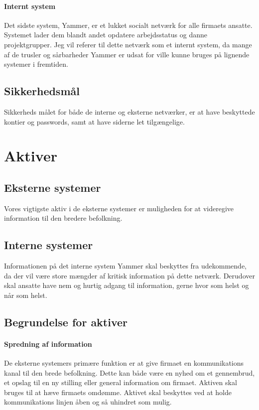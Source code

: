 \documentclass{article}
\begin{document}
\paragraph{Internt system}
Det sidste system, Yammer, er et lukket socialt netværk for alle firmaets ansatte. Systemet lader dem blandt andet opdatere arbejdsstatus og danne projektgrupper. Jeg vil referer til dette netværk som et internt system, da mange af de trusler og sårbarheder Yammer er udsat for ville kunne bruges på lignende systemer i fremtiden.

\subsection{Sikkerhedsmål}

Sikkerheds målet for både de interne og eksterne netværker, er at have beskyttede kontier og passwords,
samt at have siderne let tilgængelige. 

\section{Aktiver}
\subsection{Eksterne systemer}
Vores vigtigste aktiv i de eksterne systemer er muligheden for at videregive information til den bredere befolkning. 

\subsection{Interne systemer}
Informationen på det interne system Yammer skal beskyttes fra udekommende, da der vil være store mængder af kritisk information på dette netværk. Derudover skal ansatte have nem og hurtig adgang til information, gerne hvor som helst og når som helst.

\subsection{Begrundelse for aktiver}

\paragraph{Spredning af information}
De eksterne systemers primære funktion er at give firmaet en kommunikations kanal til den brede befolkning. Dette kan både være en nyhed om et gennembrud, et opslag til en ny stilling eller general information om firmaet. Aktiven skal bruges til at hæve firmaets omdømme. Aktivet skal beskyttes ved at holde kommunikations linjen åben og så uhindret som mulig.
\end{document}
